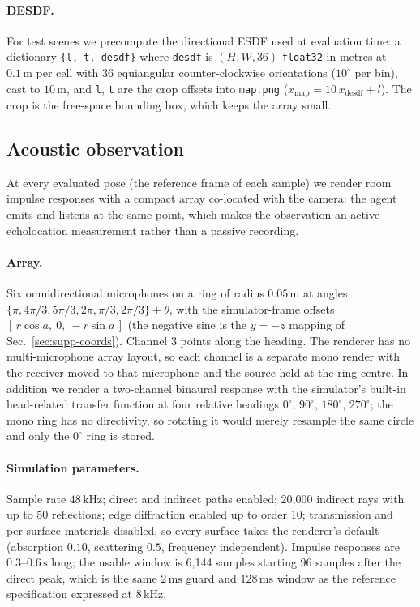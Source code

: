 \paragraph{DESDF.}
For test scenes we precompute the directional ESDF used at evaluation time: a
dictionary \texttt{\{l, t, desdf\}} where \texttt{desdf} is
$(H, W, 36)$ \texttt{float32} in metres at $0.1\,\mathrm{m}$ per cell with 36
equiangular counter-clockwise orientations ($10^\circ$ per bin), cast to
$10\,\mathrm{m}$, and \texttt{l}, \texttt{t} are the crop offsets into
\texttt{map.png} ($x_{\mathrm{map}} = 10\,x_{\mathrm{desdf}} + l$). The crop is the
free-space bounding box, which keeps the array small.

\subsection{Acoustic observation}
\label{sec:supp-acoustics}

At every evaluated pose (the reference frame of each sample) we render room impulse
responses with a compact array co-located with the camera: the agent emits and
listens at the same point, which makes the observation an active echolocation
measurement rather than a passive recording.

\paragraph{Array.}
Six omnidirectional microphones on a ring of radius $0.05\,\mathrm{m}$ at angles
$\{\pi, 4\pi/3, 5\pi/3, 2\pi, \pi/3, 2\pi/3\} + \theta$, with the simulator-frame
offsets $[\,r\cos a,\ 0,\ -r\sin a\,]$ (the negative sine is the $y = -z$ mapping of
Sec.~\ref{sec:supp-coords}). Channel 3 points along the heading. The renderer has
no multi-microphone array layout, so each channel is a separate mono render with
the receiver moved to that microphone and the source held at the ring centre. In
addition we render a two-channel binaural response with the simulator's built-in
head-related transfer function at four relative headings $0^\circ$, $90^\circ$,
$180^\circ$, $270^\circ$; the mono ring has no directivity, so rotating it would
merely resample the same circle and only the $0^\circ$ ring is stored.

\paragraph{Simulation parameters.}
Sample rate $48\,\mathrm{kHz}$; direct and indirect paths enabled; 20{,}000 indirect
rays with up to 50 reflections; edge diffraction enabled up to order 10;
transmission and per-surface materials disabled, so every surface takes the
renderer's default (absorption $0.10$, scattering $0.5$, frequency independent).
Impulse responses are $0.3$--$0.6\,\mathrm{s}$ long; the usable window is 6{,}144
samples starting 96 samples after the direct peak, which is the same
$2\,\mathrm{ms}$ guard and $128\,\mathrm{ms}$ window as the reference
specification expressed at $8\,\mathrm{kHz}$.

